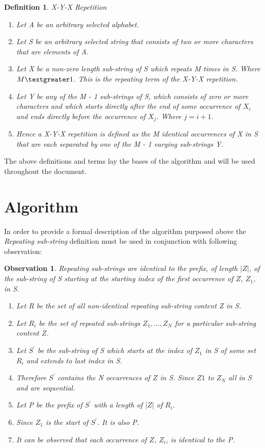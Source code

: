 \documentclass[12pt]{article}
\newtheorem{defn}{Definition}[section]
\newtheorem{obser}{Observation}[section]
\begin{document}
\begin{defn} X-Y-X Repetition
	\begin{enumerate}
		\item Let A be an arbitrary selected alphabet.
		\item Let S be an arbitrary selected string that consists of two or more characters that are elements of A. 
		\item Let X be a non-zero length sub-string of S which repeats M times in S. Where $ M \textgreater 1 $. This is the repeating term of the X-Y-X repetition.		
		\item  Let Y be any of the M - 1 sub-strings of S, which consists of zero or more characters and which starts directly after the end of some occurrence of $X_{i}$ and ends directly before the occurrence of $X_{j}$. Where $j = i + 1$.
		\item Hence a X-Y-X repetition is defined as the M identical occurrences of X in S that are each separated by one of the M - 1 varying sub-strings Y.	
	\end{enumerate}
\end{defn}

The above definitions and terms lay the bases of the algorithm and will be used throughout the document.

\section{Algorithm} 
In order to provide a formal description of the algorithm purposed above the \textit{Repeating sub-string} definition must be used in conjunction with following observation:
\begin{obser} 
Repeating sub-strings are identical to the prefix, of length $|Z|$, of the sub-string of S starting at the starting index of the first occurrence of $Z$, $Z_{1}$, in S. 
	\begin{enumerate}		
		\item Let R be the set of all non-identical repeating sub-string content Z in S.
		\item Let $R_{i}$ be the set of repeated sub-strings ${Z_{1},...,Z_{N}}$ for a particular sub-string content $Z$.
		\item Let $S^{\prime}$ be the sub-string of S which starts at the index of $Z_{1}$ in S of some set $R_{i}$ and extends to last index in S.
		\item Therefore $S^{\prime}$ contains the N occurrences of $Z$ in S. Since $Z{1}$ to $Z_{N}$ all in S and are sequential.
		\item Let P be the prefix of $S^{\prime}$ with a length of $|Z|$ of $R_{i}$.		
		\item Since $Z_{1}$ is the start of $S^{\prime}$. It is also P.
		\item It can be observed that each occurrence of $Z$, $Z_{i}$, is identical to the P.
	\end{enumerate}
\end{obser}
\end{document}
